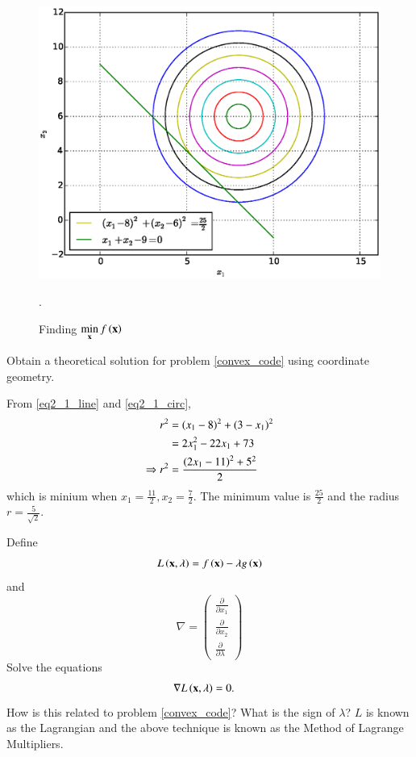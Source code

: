 \documentclass[journal,12pt,twocolumn]{IEEEtran}
\begin{document}
%
\begin{figure}[!ht]
\centering
\includegraphics[width=\columnwidth]{./figs/2.1.eps}
\caption{ Finding $ \displaystyle \min_{\mathbf{x}}f\left(\mathbf{x}\right)$}.
\label{fig.2.1}	
\end{figure}
%
\begin{problem}
Obtain a theoretical solution for problem \ref{convex_code} using coordinate geometry.
\end{problem}
\solution 
From \eqref{eq2_1_line} and \eqref{eq2_1_circ}, 
%
\begin{align}
r^2 & = (x_1-8)^2 + (3- x_1)^2 \\
&= 2 x_1^2 - 22 x_1 + 73 \\
\Rightarrow r^2 &= \frac{\left(2x_1-11\right)^2 + 5^2}{2}
\end{align}
%
which is minium when $x_1 = \frac{11}{2}, x_2 = \frac{7}{2}$.  The minimum value is $\frac{25}{2}$ and 
the radius $r = \frac{5}{\sqrt{2}}$.
\begin{problem}
\label{lagrange}
	Define 
	\begin{equation}
	\label{lagrangian}
	L\brak{\mbf{x},\lambda} = f\brak{\mbf{x}} - \lambda g\brak{\mbf{x}}%
	\end{equation}
and
\begin{equation}
\nabla =  
\begin{pmatrix}
\frac{\partial}{\partial x_1} \\
\frac{\partial}{\partial x_2} \\
\frac{\partial}{\partial \lambda} 
\end{pmatrix}
\end{equation}
Solve the equations
%
\begin{align}
\nabla L\left(\mathbf{x},\lambda\right) &= 0.
\label{tangent}
\end{align}
%
How is this related to problem \ref{convex_code}? What is the sign of $\lambda$?  $L$ is known as the Lagrangian and the above technique is known as the Method of Lagrange Multipliers.
\end{problem}
\end{document}
